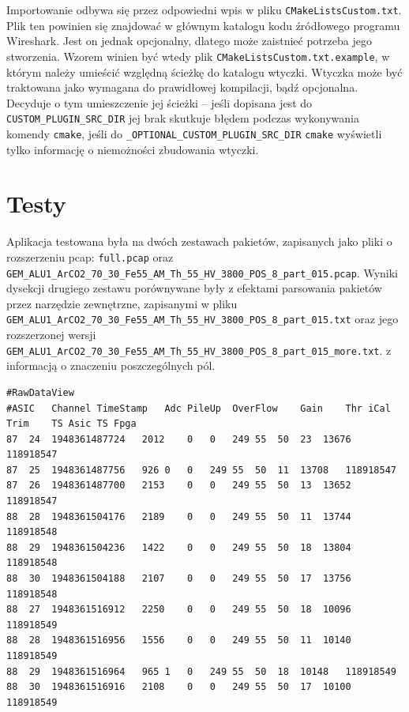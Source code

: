 \documentclass[a4paper, 12pt, twoside, openright]{article}
\begin{document}
Importowanie odbywa się przez odpowiedni wpis w pliku \texttt{CMakeListsCustom.txt}. Plik ten powinien się znajdować w głównym katalogu kodu źródłowego
programu Wireshark. Jest on jednak opcjonalny, dlatego może zaistnieć potrzeba jego stworzenia. Wzorem winien być wtedy plik \texttt{CMakeListsCustom.txt.example},
w którym należy umieścić względną ścieżkę do katalogu wtyczki. Wtyczka może być traktowana jako wymagana do prawidłowej kompilacji, bądź opcjonalna.
Decyduje o tym umieszczenie jej ścieżki -- jeśli dopisana jest do \texttt{CUSTOM\_PLUGIN\_SRC\_DIR} jej brak skutkuje błędem podczas wykonywania komendy
\texttt{cmake}, jeśli do \texttt{\_OPTIONAL\_CUSTOM\_PLUGIN\_SRC\_DIR} \texttt{cmake} wyświetli tylko informację o niemożności zbudowania wtyczki.

\section{Testy}

Aplikacja testowana była na dwóch zestawach pakietów, zapisanych jako pliki o rozszerzeniu pcap:
\texttt{full.pcap} oraz \texttt{GEM\_ALU1\_ArCO2\_70\_30\_Fe55\_AM\_Th\_55\_HV\_3800\_POS\_8\_part\_015.pcap}.
Wyniki dysekcji drugiego zestawu porównywane były z efektami parsowania pakietów przez narzędzie zewnętrzne,
zapisanymi w pliku \texttt{GEM\_ALU1\_ArCO2\_70\_30\_Fe55\_AM\_Th\_55\_HV\_3800\_POS\_8\_part\_015.txt} oraz
jego rozszerzonej wersji \texttt{GEM\_ALU1\_ArCO2\_70\_30\_Fe55\_AM\_Th\_55\_HV\_3800\_POS\_8\_part\_015\_more.txt}.
z informacją o znaczeniu poszczególnych pól.

\begin{lstlisting}[style=CStyle,caption={Zawartość pliku .txt}]
#RawDataView
#ASIC	Channel	TimeStamp	Adc	PileUp	OverFlow	Gain	Thr	iCal	Trim	TS Asic	TS Fpga
87	24	1948361487724	2012	0	0	249	55	50	23	13676	118918547
87	25	1948361487756	926	0	0	249	55	50	11	13708	118918547
87	26	1948361487700	2153	0	0	249	55	50	13	13652	118918547
88	28	1948361504176	2189	0	0	249	55	50	11	13744	118918548
88	29	1948361504236	1422	0	0	249	55	50	18	13804	118918548
88	30	1948361504188	2107	0	0	249	55	50	17	13756	118918548
88	27	1948361516912	2250	0	0	249	55	50	18	10096	118918549
88	28	1948361516956	1556	0	0	249	55	50	11	10140	118918549
88	29	1948361516964	965	1	0	249	55	50	18	10148	118918549
88	30	1948361516916	2108	0	0	249	55	50	17	10100	118918549
\end{lstlisting}
\end{document}
